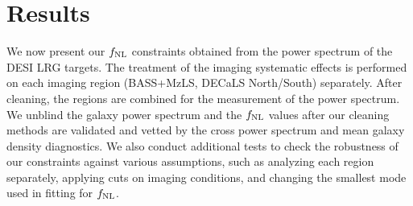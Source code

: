 \section{Results}\label{sec:results}
We now present our $f_{\rm NL}$ constraints obtained from the power spectrum of the DESI LRG targets. The treatment of the imaging systematic effects is performed on each imaging region (BASS+MzLS, DECaLS North/South) separately. After cleaning, the regions are combined for the measurement of the power spectrum. We unblind the galaxy power spectrum and the $f_{\rm NL}$ values after our cleaning methods are validated and vetted by the cross power spectrum and mean galaxy density diagnostics. We also conduct additional tests to check the robustness of our constraints against various assumptions, such as analyzing each region separately, applying cuts on imaging conditions, and changing the smallest mode used in fitting for $f_{\rm NL}$.

